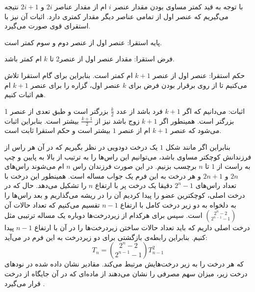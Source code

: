 \p
    با توجه به قید کمتر مساوی بودن مقدار عنصر $i$ ام از مقدار عناصر
    $2i$
    و
    $2i+1$
    نتیجه می‌گیریم که عنصر اول از تمامی عناصر دیگر مقدار کمتری دارد. اثبات آن نیز با استقرای قوی صورت می‌گیرد. 
     

    پایه استقرا: عنصر اول از عنصر دوم و سوم کمتر است. 
    
    فرض استقرا: مقدار عنصر اول از عنصر2 تا $k$ ام کمتر باشد. 
    
    حکم استقرا: عنصر اول از عنصر $k + 1$  ام کمتر است. بنابراین برای گام استقرا تلاش می‌کنیم تا از روی برقرار بودن فرض برای $k$ عنصر اول، گزاره را برای عنصر $k+1$ ام هم اثبات کنیم. 
    
    اثبات: می‌دانیم که اگر $k+1$ فرد باشد از عدد $\frac{k}{2}$ بزرگتر است و طبق تعدی از عنصر 1 بزرگتر است. همینطور اگر $k+1$ زوج باشد نیز از $\frac{k+1}{2}$ بیشتر است. بنابراین اثبات می‌شود که عنصر $k+1$ ام از عنصر $1$ بیشتر است و حکم استقرا ثابت است. 
    
    بنابراین اگر مانند شکل $1$ یک درخت دودویی در نظر بگیریم که در آن هر راس از فرزندانش کوچکتر مساوی باشد، می‌توانیم این راس‌ها را به ترتیب از بالا به پایین و چپ به راست از $1$ تا $n$ برچسب بزنیم. در این صورت فرزندان راس $n$ ام می‌شوند راس‌های ${2n}$ و ${2n + 1}$ و هر درخت به این فرم یک جواب مساله است. همینطور این درخت با تعداد راس‌های
     $2^{n}-1$ دقیقا یک درخت پر با ارتفاع ${n}$ را تشکیل می‌دهد. حال که در درخت اصلی، کوچکترین عضو را پیدا کردیم آن را در ریشه می‌گذاریم و بعد راس‌ها را به دلخواه به دو زیر درخت کامل با ارتفاع ${n-1}$ تقسیم می‌کنیم که تعداد حالات آن   
     $ { 2^n-2 \choose 2^{n-1}-1 }$ است. سپس برای هرکدام از زیردرخت‌ها دوباره یک مساله ترتیبی مثل درخت اصلی داریم که باید تعداد حالات ساختن زیردرخت‌ها را در آن با ارتفاع $n-1$ پیدا کنیم. بنابراین رابطه‌ی بازگشتی برای دو زیردرخت به این فرم در می‌آید:
    $$ T_n = {2^n-2 \choose 2^{n-1}-1 } T_{n-1}^2 $$
که هر درخت را به زیر درخت‌هایش مرتبط می‌کند. مقادیر نشان داده شده در نودهای درخت زیر، میزان سهم مصرفی را نشان می‌دهند از ماده‌ای که در آن جایگاه از درخت قرار می‌گیرد        .
\p  
{}
